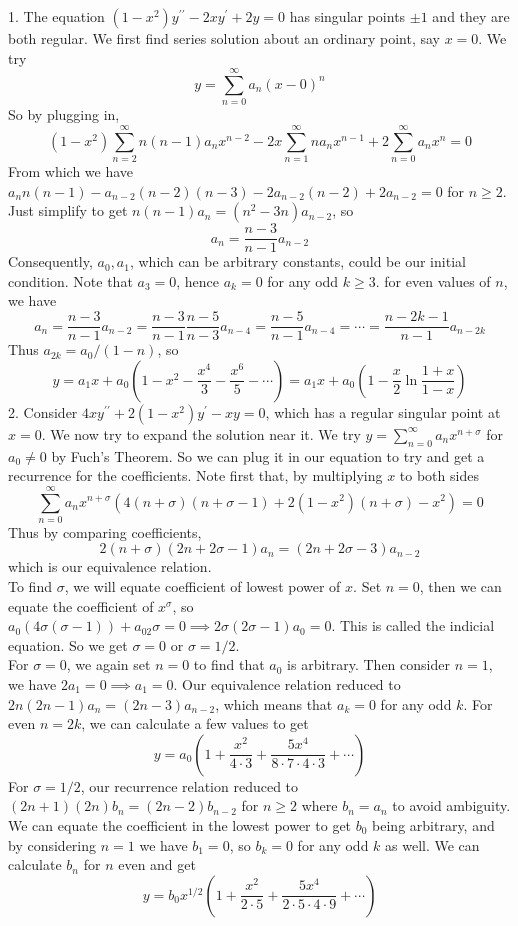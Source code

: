 \begin{example}
    1. The equation $(1-x^2)y^{\prime\prime}-2xy^\prime+2y=0$ has singular points $\pm 1$ and they are both regular.
    We first find series solution about an ordinary point, say $x=0$.
    We try
    $$y=\sum_{n=0}^\infty a_n(x-0)^{n}$$
    So by plugging in,
    $$(1-x^2)\sum_{n=2}^\infty n(n-1)a_nx^{n-2}-2x\sum_{n=1}^\infty na_nx^{n-1}+2\sum_{n=0}^\infty a_nx^{n}=0$$
    From which we have $a_nn(n-1)-a_{n-2}(n-2)(n-3)-2a_{n-2}(n-2)+2a_{n-2}=0$ for $n\ge 2$.
    Just simplify to get $n(n-1)a_n=(n^2-3n)a_{n-2}$, so
    $$a_n=\frac{n-3}{n-1}a_{n-2}$$
    Consequently, $a_0,a_1$, which can be arbitrary constants, could be our initial condition.
    Note that $a_3=0$, hence $a_k=0$ for any odd $k\ge 3$.
    for even values of $n$, we have
    $$a_n=\frac{n-3}{n-1}a_{n-2}=\frac{n-3}{n-1}\frac{n-5}{n-3}a_{n-4}=\frac{n-5}{n-1}a_{n-4}=\cdots=\frac{n-2k-1}{n-1}a_{n-2k}$$
    Thus $a_{2k}=a_0/(1-n)$, so
    $$y=a_1x+a_0\left(1-x^2-\frac{x^4}{3}-\frac{x^6}{5}-\cdots\right)=a_1x+a_0\left( 1-\frac{x}{2}\ln\frac{1+x}{1-x} \right)$$
    2. Consider $4xy^{\prime\prime}+2(1-x^2)y^\prime-xy=0$, which has a regular singular point at $x=0$.
    We now try to expand the solution near it.
    We try $y=\sum_{n=0}^\infty a_nx^{n+\sigma}$ for $a_0\neq 0$ by Fuch's Theorem.
    So we can plug it in our equation to try and get a recurrence for the coefficients.
    Note first that, by multiplying $x$ to both sides
    $$\sum_{n=0}^\infty a_nx^{n+\sigma}(4(n+\sigma)(n+\sigma-1)+2(1-x^2)(n+\sigma)-x^2)=0$$
    Thus by comparing coefficients,
    $$2(n+\sigma)(2n+2\sigma-1)a_n=(2n+2\sigma-3)a_{n-2}$$
    which is our equivalence relation.\\
    To find $\sigma$, we will equate coefficient of lowest power of $x$.
    Set $n=0$, then we can equate the coefficient of $x^\sigma$, so $a_0(4\sigma(\sigma-1))+a_02\sigma=0\implies 2\sigma(2\sigma-1)a_0=0$.
    This is called the indicial equation.
    So we get $\sigma=0$ or $\sigma=1/2$.\\
    For $\sigma=0$, we again set $n=0$ to find that $a_0$ is arbitrary.
    Then consider $n=1$, we have $2a_1=0\implies a_1=0$.
    Our equivalence relation reduced to $2n(2n-1)a_n=(2n-3)a_{n-2}$, which means that $a_k=0$ for any odd $k$.
    For even $n=2k$, we can calculate a few values to get
    $$y=a_0\left(1+\frac{x^2}{4\cdot 3}+\frac{5x^4}{8\cdot 7\cdot 4\cdot 3}+\cdots\right)$$
    For $\sigma=1/2$, our recurrence relation reduced to $(2n+1)(2n)b_n=(2n-2)b_{n-2}$ for $n\ge 2$ where $b_n=a_n$ to avoid ambiguity.
    We can equate the coefficient in the lowest power to get $b_0$ being arbitrary, and by considering $n=1$ we have $b_1=0$, so $b_k=0$ for any odd $k$ as well.
    We can calculate $b_n$ for $n$ even and get
    $$y=b_0x^{1/2}\left( 1+\frac{x^2}{2\cdot 5}+\frac{5x^4}{2\cdot 5\cdot 4\cdot 9}+\cdots \right)$$
\end{example}
